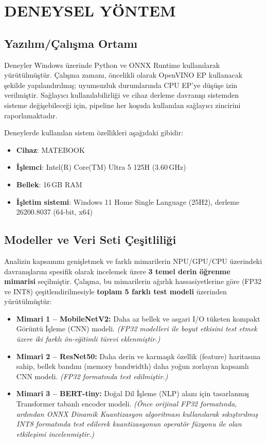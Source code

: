 \chapter{DENEYSEL YÖNTEM}

\section{Yazılım/Çalışma Ortamı}
Deneyler Windows üzerinde Python ve ONNX Runtime kullanılarak yürütülmüştür.
Çalışma zamanı, öncelikli olarak OpenVINO EP kullanacak şekilde yapılandırılmış; uyumsuzluk durumlarında CPU EP'ye düşüşe izin verilmiştir.
Sağlayıcı kullanılabilirliği ve cihaz derleme davranışı sistemden sisteme değişebileceği için, pipeline her koşuda kullanılan sağlayıcı zincirini raporlamaktadır.

Deneylerde kullanılan sistem özellikleri aşağıdaki gibidir:
\begin{itemize}
	\item \textbf{Cihaz}: MATEBOOK
	\item \textbf{İşlemci}: Intel(R) Core(TM) Ultra 5 125H (3.60\,GHz)
	\item \textbf{Bellek}: 16\,GB RAM
	\item \textbf{İşletim sistemi}: Windows 11 Home Single Language (25H2), derleme 26200.8037 (64-bit, x64)
\end{itemize}

\section{Modeller ve Veri Seti Çeşitliliği}
Analizin kapsamını genişletmek ve farklı mimarilerin NPU/GPU/CPU üzerindeki davranışlarını spesifik olarak incelemek üzere \textbf{3 temel derin öğrenme mimarisi} seçilmiştir. Çalışma, bu mimarilerin ağırlık hassasiyetlerine göre (FP32 ve INT8) çeşitlendirilmesiyle \textbf{toplam 5 farklı test modeli} üzerinden yürütülmüştür:

\begin{itemize}
	\item \textbf{Mimari 1 -- MobileNetV2:} Daha az bellek ve asgari I/O tüketen kompakt Görüntü İşleme (CNN) modeli. \textit{(FP32 modelleri ile boyut etkisini test etmek üzere iki farklı ön-eğitimli türevi eklenmiştir.)}
	\item \textbf{Mimari 2 -- ResNet50:} Daha derin ve karmaşık özellik (feature) haritasına sahip, bellek bandını (memory bandwidth) daha yoğun zorlayan kapsamlı CNN modeli. \textit{(FP32 formatında test edilmiştir.)}
	\item \textbf{Mimari 3 -- BERT-tiny:} Doğal Dil İşleme (NLP) alanı için tasarlanmış Transformer tabanlı encoder modeli. \textit{(Önce orijinal FP32 formatında, ardından ONNX Dinamik Kuantizasyon algoritması kullanılarak sıkıştırılmış INT8 formatında test edilerek kuantizasyonun operatör füzyonu ile olan etkileşimi incelenmiştir.)}
\end{itemize}

